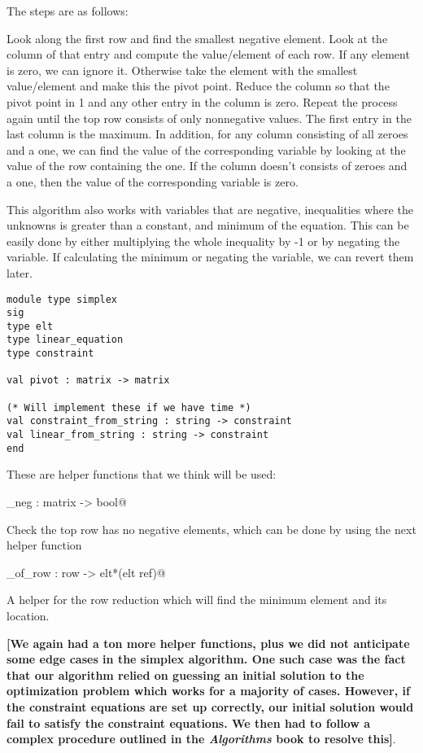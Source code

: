 \documentclass[letterpaper,11pt]{article}
\newcommand{\annot}[1]{\textbf{\color{BrickRed} [#1]}}
\begin{document}
The steps are as follows:

Look along the first row and find the smallest negative element. Look at the
column of that entry and compute the value/element of each row. If any element
is zero, we can ignore it. Otherwise take the element with the smallest
value/element and make this the pivot point. Reduce the column so that the pivot
point in 1 and any other entry in the column is zero. Repeat the process again
until the top row consists of only nonnegative values. The first entry in the
last column is the maximum. In addition, for any column consisting of all zeroes
and a one, we can find the value of the corresponding variable by looking at the
value of the row containing the one. If the column doesn’t consists of zeroes
and a one, then the value of the corresponding variable is zero. 

This algorithm also works with variables that are negative, inequalities where
the unknowns is greater than a constant, and minimum of the equation. This can
be easily done by either multiplying the whole inequality by -1 or by negating
the variable. If calculating the minimum or negating the variable, we can revert
them later.  

\begin{verbatim}
module type simplex
sig
type elt
type linear_equation
type constraint

val pivot : matrix -> matrix

(* Will implement these if we have time *)
val constraint_from_string : string -> constraint
val linear_from_string : string -> constraint
end
\end{verbatim}

These are helper functions that we think will be used:

\verb@no_neg : matrix -> bool@ 

Check the top row has no negative elements, which can be done by using the next
helper function

\verb@min_of_row : row -> elt*(elt ref)@

A helper for the row reduction which will find the minimum element and its
location.

{\annot{We again had a ton more helper functions, plus we did not anticipate
some edge cases in the simplex algorithm. One such case was the fact that our
algorithm relied on guessing an initial solution to the optimization problem
which works for a majority of cases. However, if the constraint equations are
set up correctly, our initial solution would fail to satisfy the constraint
equations. We then had to follow a complex procedure outlined in the
\emph{Algorithms} book to resolve this}}.
\end{document}
